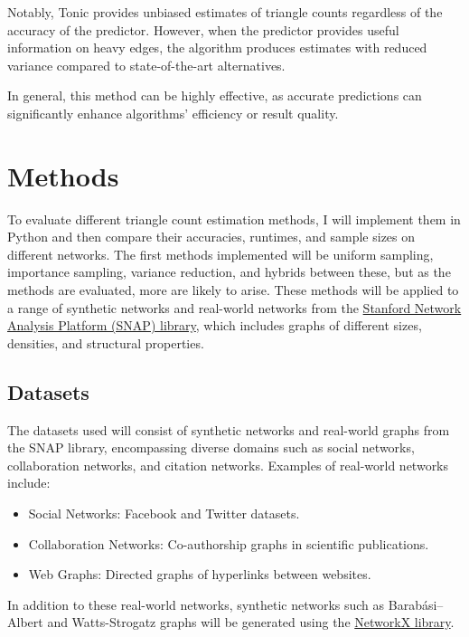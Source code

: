 \documentclass[11pt]{article}
\begin{document}
Notably, Tonic provides unbiased estimates of triangle counts regardless of the accuracy of the predictor.
However, when the predictor provides useful information on heavy edges, the algorithm produces estimates with reduced variance compared to state-of-the-art alternatives.

In general, this method can be highly effective, as accurate predictions can significantly enhance algorithms' efficiency or result quality.

\section{Methods}

To evaluate different triangle count estimation methods, I will implement them in Python and then compare their accuracies, runtimes, and sample sizes on different networks.
The first methods implemented will be uniform sampling, importance sampling, variance reduction, and hybrids between these, but as the methods are evaluated, more are likely to arise.
These methods will be applied to a range of synthetic networks and real-world networks from the \href{https://snap.stanford.edu/index.html}{Stanford Network Analysis Platform (SNAP) library}, which includes graphs of different sizes, densities, and structural properties.

\subsection{Datasets}

The datasets used will consist of synthetic networks and real-world graphs from the SNAP library, encompassing diverse domains such as social networks, collaboration networks, and citation networks.
Examples of real-world networks include:

\begin{itemize}
    \item Social Networks: Facebook and Twitter datasets.
    \item Collaboration Networks: Co-authorship graphs in scientific publications.
    \item Web Graphs: Directed graphs of hyperlinks between websites.
\end{itemize}

In addition to these real-world networks, synthetic networks such as Barabási–Albert \cite{albert_statistical_2002} and Watts-Strogatz \cite{watts_collective_1998} graphs will be generated using the \href{https://networkx.org/}{NetworkX library}.
\end{document}
